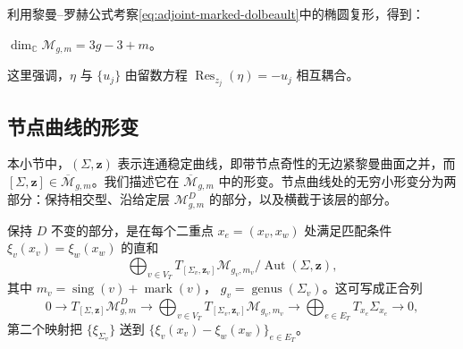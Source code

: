 利用黎曼--罗赫公式考察\eqref{eq:adjoint-marked-dolbeault}中的椭圆复形，得到：
\begin{theorem}\label{thm:dimension-moduli-stable-curves}
$\dim_{\mathbb C}\mathcal M_{g,m}=3g-3+m$。
\end{theorem}

\begin{remark}\label{rem:residue-components-coupled}
这里强调，$\eta$ 与 $\{u_j\}$ 由留数方程
$\operatorname{Res}_{z_j}(\eta)=-u_j$ 相互耦合。
\end{remark}

\subsection{节点曲线的形变}
\label{subsec:deformations-nodal-curves}

本小节中，$(\Sigma,\boldsymbol z)$ 表示连通稳定曲线，即带节点奇性的无边紧黎曼曲面之并，而
$[\Sigma,\boldsymbol z]\in\overline{\mathcal M}_{g,m}$。我们描述它在
$\overline{\mathcal M}_{g,m}$ 中的形变。节点曲线处的无穷小形变分为两部分：保持相交型、沿给定层
$\mathcal M_{g,m}^D$ 的部分，以及横截于该层的部分。

保持 $D$ 不变的部分，是在每个二重点 $x_e=(x_v,x_w)$ 处满足匹配条件
$\xi_v(x_v)=\xi_w(x_w)$ 的直和
\[
 \bigoplus_{v\in V_T}T_{[\Sigma_v,\boldsymbol z_v]}
 \mathcal M_{g_v,m_v}/\operatorname{Aut}(\Sigma,\boldsymbol z),
\]
其中 $m_v=\operatorname{sing}(v)+\operatorname{mark}(v)$，
$g_v=\operatorname{genus}(\Sigma_v)$。这可写成正合列
\begin{equation}
 0\longrightarrow T_{[\Sigma,\boldsymbol z]}\mathcal M_{g,m}^D
 \longrightarrow\bigoplus_{v\in V_T}
 T_{[\Sigma_v,\boldsymbol z_v]}\mathcal M_{g_v,m_v}
 \longrightarrow\bigoplus_{e\in E_T}T_{x_e}\Sigma_{x_e}
 \longrightarrow0,
 \label{eq:tangent-stratum-exact-sequence}
\end{equation}
第二个映射把 $\{\xi_{\Sigma_v}\}$ 送到
$\{\xi_v(x_v)-\xi_w(x_w)\}_{e\in E_T}$。

